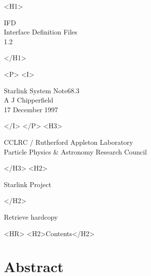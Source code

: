 \documentclass[twoside,11pt]{article}
\newcommand{\stardoccategory}  {Starlink System Note}
\newcommand{\stardocsource}    {sun\stardocnumber}
\newcommand{\stardocnumber}    {68.3}
\newcommand{\stardocauthors}   {A J Chipperfield}
\newcommand{\stardocdate}      {17 December 1997}
\newcommand{\stardoctitle}     {IFD\\[1ex]
                                Interface Definition Files}
\newcommand{\stardocversion}   {1.2}
\newcommand{\stardocmanual}    {}
\newcommand{\htmladdnormallink}[2]{#1}
\newcommand{\htmladdimg}[1]{}
\newcommand{\htmlref}[2]{#1}
\newcommand{\htmladdtonavigation}[1]{}
\newcommand{\xlabel}[1]{}
\newcommand{\latexonlytoc}[0]{\tableofcontents}
\begin{document}
\begin{htmlonly}
   \xlabel{}
   \begin{rawhtml} <H1> \end{rawhtml}
      \stardoctitle\\
      \stardocversion\\
      \stardocmanual
   \begin{rawhtml} </H1> \end{rawhtml}


   \begin{rawhtml} <P> <I> \end{rawhtml}
   \stardoccategory \stardocnumber \\
   \stardocauthors \\
   \stardocdate
   \begin{rawhtml} </I> </P> <H3> \end{rawhtml}
      \htmladdnormallink{CCLRC}{http://www.cclrc.ac.uk} /
      \htmladdnormallink{Rutherford Appleton Laboratory}
                        {http://www.cclrc.ac.uk/ral} \\
      \htmladdnormallink{Particle Physics \& Astronomy Research Council}
                        {http://www.pparc.ac.uk} \\
   \begin{rawhtml} </H3> <H2> \end{rawhtml}
      \htmladdnormallink{Starlink Project}{http://star-www.rl.ac.uk/}
   \begin{rawhtml} </H2> \end{rawhtml}
   \htmladdnormallink{\htmladdimg{source.gif} Retrieve hardcopy}
      {http://star-www.rl.ac.uk/cgi-bin/hcserver?\stardocsource}\\

  \label{stardoccontents}
  \begin{rawhtml} 
    <HR>
    <H2>Contents</H2>
  \end{rawhtml}
  \renewcommand{\latexonlytoc}[0]{}
  \htmladdtonavigation{\htmlref{\htmladdimg{contents_motif.gif}}
        {stardoccontents}}

  \section{\xlabel{abstract}Abstract}
\end{htmlonly}
\end{document}
